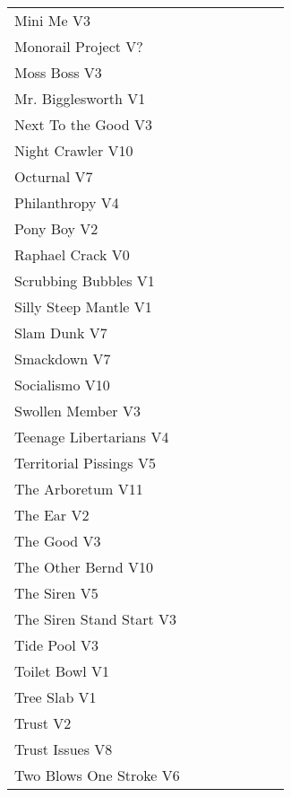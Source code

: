 \begin{center}
\begin{supertabular}{p{0.65\linewidth}r}
Mini Me V3 & \pageref{rt:Mini Me} \\
Monorail Project V? & \pageref{rt:Monorail Project} \\
Moss Boss V3 & \pageref{rt:Moss Boss} \\
Mr. Bigglesworth V1 & \pageref{vr:Mr. Bigglesworth} \\
Next To the Good V3 & \pageref{rt:Next To the Good} \\
Night Crawler V10 & \pageref{rt:Night Crawler} \\
Octurnal V7 & \pageref{rt:Octurnal} \\
Philanthropy V4 & \pageref{rt:Philanthropy} \\
Pony Boy V2 & \pageref{rt:Pony Boy} \\
Raphael Crack V0 & \pageref{rt:Raphael Crack} \\
Scrubbing Bubbles V1 & \pageref{rt:Scrubbing Bubbles} \\
Silly Steep Mantle V1 & \pageref{rt:Silly Steep Mantle} \\
Slam Dunk V7 & \pageref{rt:Slam Dunk} \\
Smackdown V7 & \pageref{rt:Smackdown} \\
Socialismo V10 & \pageref{rt:Socialismo} \\
Swollen Member V3 & \pageref{rt:Swollen Member} \\
Teenage Libertarians V4 & \pageref{rt:Teenage Libertarians} \\
Territorial Pissings V5 & \pageref{rt:Territorial Pissings} \\
The Arboretum V11 & \pageref{rt:The Arboretum} \\
The Ear V2 & \pageref{rt:The Ear} \\
The Good V3 & \pageref{rt:The Good} \\
The Other Bernd V10 & \pageref{rt:The Other Bernd} \\
The Siren V5 & \pageref{rt:The Siren} \\
The Siren Stand Start V3 & \pageref{vr:The Siren Stand Start} \\
Tide Pool V3 & \pageref{rt:Tide Pool} \\
Toilet Bowl V1 & \pageref{rt:Toilet Bowl} \\
Tree Slab V1 & \pageref{rt:Tree Slab} \\
Trust V2 & \pageref{rt:Trust} \\
Trust Issues V8 & \pageref{rt:Trust Issues} \\
Two Blows One Stroke V6 & \pageref{rt:Two Blows One Stroke} \\

\end{supertabular}
\end{center}
